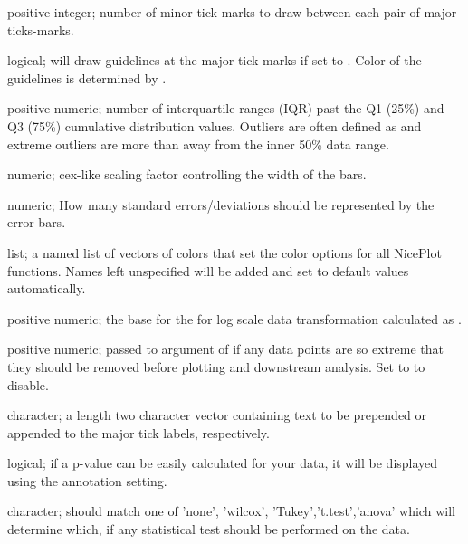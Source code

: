 \documentclass[a4paper]{book}
\begin{document}
\begin{Arguments}
\begin{ldescription}
\item[\code{minorTick}] positive integer; number of minor tick-marks to draw between each pair of major ticks-marks.

\item[\code{guides}] logical; will draw guidelines at the major tick-marks if set to . Color of the guidelines is determined by .

\item[\code{outliers}] positive numeric; number of interquartile ranges (IQR) past the Q1 (25\%) and Q3 (75\%) cumulative distribution values. Outliers are often defined as  and extreme outliers are more than  away from the inner 50\% data range.

\item[\code{width}] numeric; cex-like scaling factor controlling the width of the bars.

\item[\code{errorMultiple}] numeric; How many standard errors/deviations should be represented by the error bars.

\item[\code{plotColors}] list; a named list of vectors of colors that set the color options for all NicePlot functions. Names left unspecified will be added and set to default values automatically.

\item[\code{logScale}] positive numeric; the base for the for log scale data transformation calculated as .

\item[\code{trim}] positive numeric; passed to  argument of  if any data points are so extreme that they should be removed before plotting and downstream analysis. Set to  to disable.

\item[\code{axisText}] character; a length two character vector containing text to be prepended or appended to the major tick labels, respectively.

\item[\code{showCalc}] logical; if a p-value can be easily calculated for your data, it will be displayed using the  annotation setting.

\item[\code{calcType}] character; should match one of 'none', 'wilcox', 'Tukey','t.test','anova' which will determine which, if any statistical test should be performed on the data.


\end{ldescription}
\end{Arguments}
\end{document}

